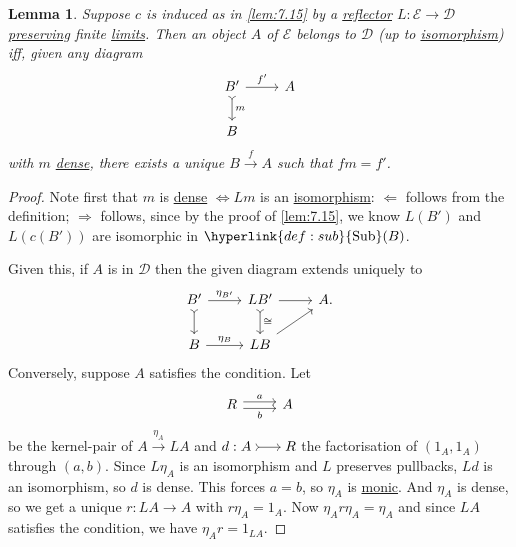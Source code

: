 \documentclass{article}
\DeclareMathOperator{\Sub}{Sub}
\newenvironment{tikzcdi}{\begin{tikzcd}[cramped, sep=scriptsize]}{\end{tikzcd}}
\newtheorem{nlemma}[nthm]{Lemma}
\begin{document}
\begin{nlemma}\label{lem:7.18}
  Suppose $c$ is induced as in \cref{lem:7.15} by a \hyperlink{def:refl}{reflector} $L: \mathscr{E} \to \mathscr{D}$
  \hyperlink{def:plim}{preserving} finite \hyperlink{def:limit}{limits}.
  Then an object $A$ of $\mathscr{E}$ belongs to $\mathscr{D}$ (up to \hyperlink{def:iso}{isomorphism}) iff, given any diagram
  \begin{equation*}
  \begin{tikzcd}
    B' \dar[tail]{m} \rar{f'} & A \\
    B
  \end{tikzcd}
  \end{equation*}
  with $m$ \hyperlink{def:denseclosed}{dense}, there exists a unique $B \xrightarrow{f} A$ such that $fm=f'$.
\end{nlemma}
\begin{proof}
  Note first that $m$ is \hyperlink{def:denseclosed}{dense} $\iff Lm$ is an \hyperlink{def:iso}{isomorphism}:
  $\Leftarrow$ follows from the definition; $\Rightarrow$ follows, since by the proof of \cref{lem:7.15}, we know $L(B')$ and $L(c(B'))$ are isomorphic in $\hyperlink{def:sub}{\Sub}(B)$.

  Given this, if $A$ is in $\mathscr{D}$ then the given diagram extends uniquely to
  \begin{equation*}
    \begin{tikzcd}
      B' \rar{\eta_{B'}} \dar[tail] & LB' \dar[tail]{\cong} \rar& A. \\
      B \rar{\eta_B}& LB \arrow[ur]
    \end{tikzcd}
  \end{equation*}
  Conversely, suppose $A$ satisfies the condition.
  Let
  \begin{equation*}
    \begin{tikzcd}
      R \rar[shift left]{a} \rar[shift right,']{b} & A
    \end{tikzcd}
  \end{equation*}
  be the kernel-pair of $A \xrightarrow{\eta_A} LA$ and $d: \begin{tikzcdi}A \rar[tail]& R\end{tikzcdi}$ the factorisation of $(1_A,1_A)$ through $(a,b)$.
  Since $L \eta_A$ is an isomorphism and $L$ preserves pullbacks, $Ld$ is an isomorphism, so $d$ is dense.
  This forces $a=b$, so $\eta_A$ is \hyperlink{def:monic}{monic}.
  And $\eta_A$ is dense, so we get a unique $r: LA \to A$ with $r \eta_A = 1_A$.
  Now $\eta_A r \eta_A = \eta_A$ and since $LA$ satisfies the condition, we have $\eta_A r = 1_{LA}$.
\end{proof}
\end{document}
